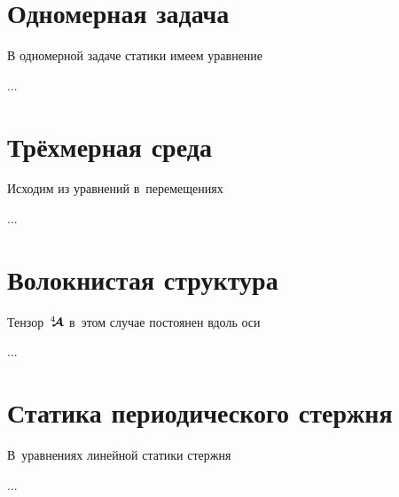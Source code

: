 


\thispagestyle{empty}

\label{chapter:periodicstructures}

\begin{otherlanguage}{russian}

\section{Одномерная задача}

\lettrine[lines=2, findent=2pt, nindent=0pt]{В}{\hspace{-0.25ex}} одномерной задаче статики имеем уравнение

...



\section{Трёхмерная среда}

Исходим из уравнений в~перемещениях

...



\section{Волокнистая структура}

Тензор~${\hspace{.08ex}{^4\hspace{-0.72ex}\bm{\mathcal{A}}}\hspace{.08ex}}$ в~этом случае постоянен вдоль оси

...



\section{Статика периодического стержня}

В~уравнениях линейной статики стержня

...




\end{otherlanguage}

